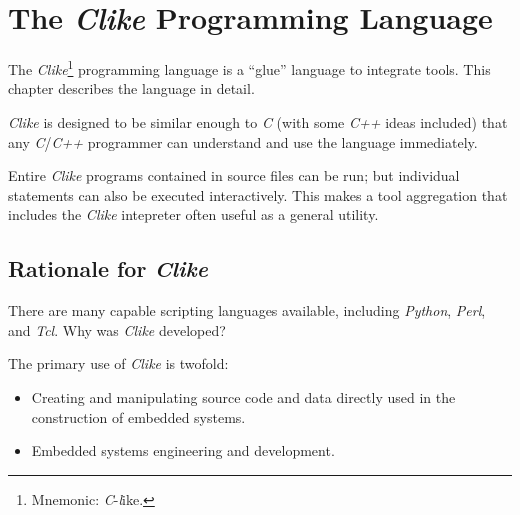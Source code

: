 \chapter{The \emph{Clike} Programming Language}
\label{ccik2}

The \emph{Clike}\footnote{Mnemonic: \emph{C}-\emph{l}ike.}
programming language is a ``glue'' language to integrate tools.  This chapter describes
the language in detail.

\emph{Clike} is designed to be similar enough to
\emph{C}
(with some \emph{C++}
ideas included) that any \emph{C}/\emph{C++} programmer can understand and
use the language immediately.

Entire \emph{Clike} programs contained in source files can be run; but individual
statements can also be executed interactively.  This makes a tool aggregation that
includes the \emph{Clike} intepreter often useful as a general utility.


\section{Rationale for \emph{Clike}}
\label{ccik2:swno0}

There are many capable scripting languages available, including
\emph{Python},
\emph{Perl}, and
\emph{Tcl}.
Why was \emph{Clike} developed?

The primary use of \emph{Clike} is twofold:

\begin{itemize}
   \item Creating and manipulating source code and data directly used in the construction
         of embedded systems.
   \item Embedded systems engineering and development.
\end{itemize}

